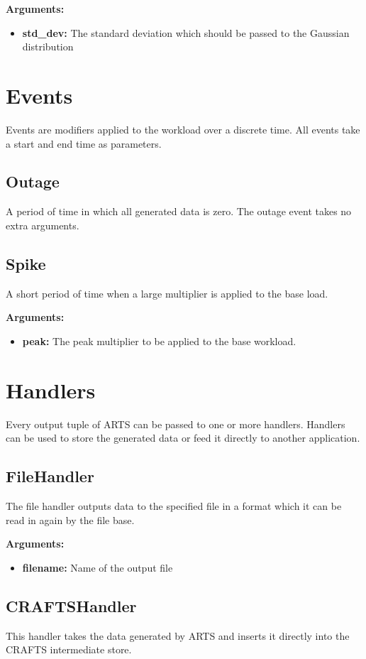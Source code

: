\textbf{Arguments:}
\begin{itemize}
\item \textbf{std\_dev:} The standard deviation which should be passed to the Gaussian distribution
\end{itemize}

\section{Events}
Events are modifiers applied to the workload over a discrete time. All events take a start and end time as parameters.

\subsection{Outage}
A period of time in which all generated data is zero. The outage event takes no extra arguments.

\subsection{Spike}
A short period of time when a large multiplier is applied to the base load.

\textbf{Arguments:}
\begin{itemize}
\item \textbf{peak:} The peak multiplier to be applied to the base workload.
\end{itemize}

\section{Handlers}
Every output tuple of ARTS can be passed to one or more handlers. Handlers can be used to store the generated data or feed it directly to another application.

\subsection{FileHandler}
The file handler outputs data to the specified file in a format which it can be read in again by the file base.

\textbf{Arguments:}
\begin{itemize}
\item \textbf{filename:} Name of the output file
\end{itemize}

\subsection{CRAFTSHandler}
This handler takes the data generated by ARTS and inserts it directly into the CRAFTS intermediate store.

